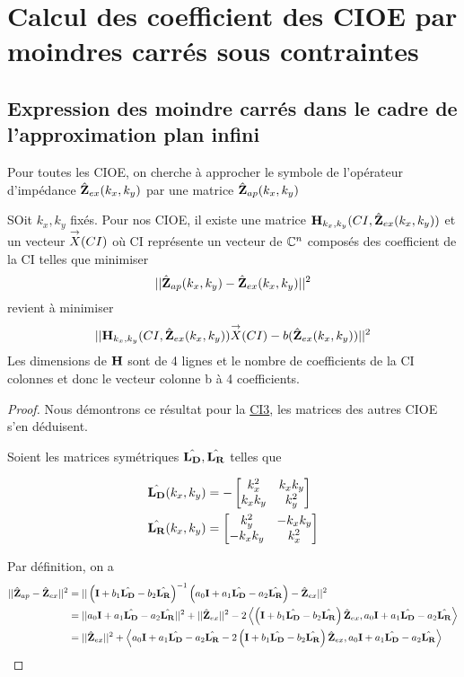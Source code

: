 \section{Calcul des coefficient des CIOE par moindres carrés sous contraintes}

\subsection{Expression des moindre carrés dans le cadre de l'approximation plan infini}
  Pour toutes les CIOE, on cherche à approcher le symbole de l'opérateur d'impédance \(\hat{\mathbf{Z}}_{ex}(k_x,k_y)\) par une matrice \(\hat{\mathbf{Z}}_{ap}(k_x,k_y)\)

  \begin{prop}
    SOit \(k_x,k_y\) fixés.
    Pour nos CIOE, il existe une matrice \(\mathbf{H}_{k_x,k_y}(CI,\hat{\mathbf{Z}}_{ex}(k_x,k_y))\) et un vecteur \({\overset{\rightarrow}{X}}(CI)\) où CI représente un vecteur de \(\mathbb C^n\) composés des coefficient de la CI telles que minimiser 
    \[
      ||\hat{\mathbf{Z}}_{ap}(k_x,k_y)-\hat{\mathbf{Z}}_{ex}(k_x,k_y)||^2
    \] 
    revient à minimiser 
    \[ 
      || \mathbf{H}_{k_x,k_y}(CI,\hat{\mathbf{Z}}_{ex}(k_x,k_y)) {\overset{\rightarrow}{X}}(CI) - b(\hat{\mathbf{Z}}_{ex}(k_x,k_y)) ||^2
    \]
    Les dimensions de \(\mathbf{H}\) sont de 4 lignes et le nombre de coefficients de la CI colonnes et donc le vecteur colonne b à 4 coefficients.
  \end{prop}

  \begin{proof}
    Nous démontrons ce résultat pour la \hyperlink{ci3}{CI3}, les matrices des autres CIOE s'en déduisent.

    Soient les matrices symétriques \(\hat{\mathbf{L_D}}, \hat{\mathbf{L_R}}\) telles que

    \begin{align}
      \hat{\mathbf{L_D}}(k_x,k_y) & = - \begin{bmatrix} k_x^2 & k_x k_y \\ k_x k_y & k_y^2 \end{bmatrix}
      \\
      \hat{\mathbf{L_R}}(k_x,k_y) & =  \begin{bmatrix} k_y^2 & -k_x k_y \\ -k_x k_y &  k_x^2 \end{bmatrix}
    \end{align}

    Par définition, on a
    \begin{align}
    ||\hat{\mathbf{Z}}_{ap}-\hat{\mathbf{Z}}_{ex}||^2 &= ||\left(\mathbf{I} + b_1 \hat{\mathbf{L_D}} - b_2 \hat{\mathbf{L_R}}\right)^{-1}\left(a_0\mathbf{I} + a_1 \hat{\mathbf{L_D}} - a_2 \hat{\mathbf{L_R}}\right)-\hat{\mathbf{Z}}_{ex} ||^2
    \\
    &= || a_0\mathbf{I} + a_1 \hat{\mathbf{L_D}} - a_2 \hat{\mathbf{L_R}} ||^2 + ||\hat{\mathbf{Z}}_{ex}||^2 - 2 \left<\left(\mathbf{I} + b_1 \hat{\mathbf{L_D}} - b_2 \hat{\mathbf{L_R}}\right)\hat{\mathbf{Z}}_{ex},a_0\mathbf{I} + a_1 \hat{\mathbf{L_D}} - a_2 \hat{\mathbf{L_R}} \right>
    \\
    &= ||\hat{\mathbf{Z}}_{ex}||^2 + \left<a_0\mathbf{I} + a_1 \hat{\mathbf{L_D}} - a_2 \hat{\mathbf{L_R}} -2\left(\mathbf{I} + b_1 \hat{\mathbf{L_D}} - b_2 \hat{\mathbf{L_R}}\right)\hat{\mathbf{Z}}_{ex},a_0\mathbf{I} + a_1 \hat{\mathbf{L_D}} - a_2 \hat{\mathbf{L_R}} \right> 
    \end{align}
  \end{proof}